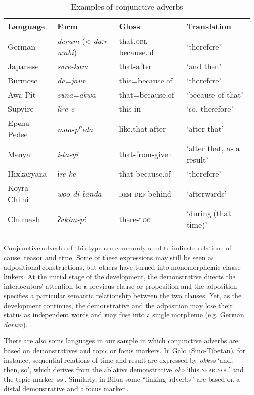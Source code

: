 \documentclass[output=paper,colorlinks,citecolor=brown]{langscibook}
\begin{document}
\begin{table}
\begin{tabularx}{\textwidth}{lXll}
\lsptoprule
\textbf{Language} & \textbf{Form} & \textbf{Gloss} & \textbf{Translation}\\
\midrule
German & \textit{darum} \newline (< \textit{daːr-umbi}) & that\textsc{.obl}-because.of & ‘therefore’\\
Japanese & \textit{sore-kara}  & that-after & ‘and then’\\
Burmese & \textit{da=jaun} & this=because.of & ‘therefore’\\
Awa Pit & \textit{suna=akwa} & that=because.of & ‘because of that’\\
Supyire & \textit{lire e} & this in & ‘so, therefore’\\
Epena Pedee & \textit{maa-p\textsuperscript{h}éda} & like.that-after& ‘after that’\\
Menya & \textit{i-ta-ŋi} & that-from-given & ‘after that, as a result’\\
Hixkaryana & \textit{ɨre ke} & that because.of & ‘therefore’\\
Koyra Chiini & \textit{woo di banda} & \textsc{dem} \textsc{def} behind  & ‘afterwards’\\
Chumash  & \textit{ʔakim-pi}   & there-\textsc{loc}  & ‘during (that time)’\\
\lspbottomrule
\end{tabularx}
\caption{Examples of conjunctive adverbs}
\label{tab:diessel:2}
\end{table}

Conjunctive adverbs of this type are commonly used to indicate relations of cause, reason and time. Some of these expressions may still be seen as adpositional constructions, but others have turned into monomorphemic clause linkers. At the initial stage of the development, the demonstrative directs the interlocutors’ attention to a previous clause or proposition and the adposition specifies a particular semantic relationship between the two clauses. Yet, as the development continues, the demonstrative and the adposition may lose their status as independent words and may fuse into a single morpheme (e.g. German \textit{darum}).

There are also some languages in our sample in which conjunctive adverbs are based on demonstratives and topic or focus markers. In Galo (Sino-Tibetan), for instance, sequential relations of time and result are expressed by \textit{okkəə} ‘and, then, so’, which derives from the ablative demonstrative \textit{okə} ‘this.\textsc{near.you}’ and the topic marker \textit{əə} \citep[370]{Post2007}. Similarly, in Bilua some “linking adverbs” are based on a distal demonstrative and a focus marker .
\end{document}
